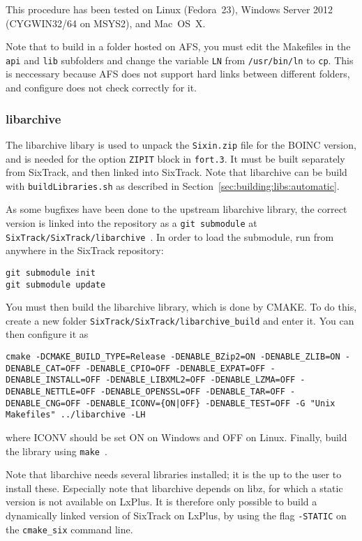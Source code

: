 \documentclass[english,BCOR=0mm,DIV=18]{scrartcl}
\begin{document}
This procedure has been tested on Linux (Fedora~23), Windows Server 2012 (CYGWIN32/64 on MSYS2), and Mac~OS~X.

Note that to build in a folder hosted on AFS, you must edit the Makefiles in the \texttt{api} and \texttt{lib} subfolders and change the variable \texttt{LN} from \texttt{/usr/bin/ln} to \texttt{cp}.
This is neccessary because AFS does not support hard links between different folders, and configure does not check correctly for it.

\subsubsection{libarchive}
\label{sec:building:libs:libarchive}
The libarchive libary is used to unpack the \texttt{Sixin.zip} file for the BOINC version, and is needed for the option \texttt{ZIPIT} block in \texttt{fort.3}.
It must be built separately from SixTrack, and then linked into SixTrack.
Note that libarchive can be build with \texttt{buildLibraries.sh} as described in Section~\ref{sec:building:libs:automatic}.

As some bugfixes have been done to the upstream libarchive library, the correct version is linked into the repository as a \texttt{git submodule}  at \texttt{SixTrack/SixTrack/libarchive}~.
In order to load the submodule, run from anywhere in the SixTrack repository:
\begin{lstlisting}
git submodule init
git submodule update
\end{lstlisting}

You must then build the libarchive library, which is done by CMAKE.
To do this, create a new folder \texttt{SixTrack/SixTrack/libarchive\_build} and enter it.
You can then configure it as 
\begin{lstlisting}
cmake -DCMAKE_BUILD_TYPE=Release -DENABLE_BZip2=ON -DENABLE_ZLIB=ON -DENABLE_CAT=OFF -DENABLE_CPIO=OFF -DENABLE_EXPAT=OFF -DENABLE_INSTALL=OFF -DENABLE_LIBXML2=OFF -DENABLE_LZMA=OFF -DENABLE_NETTLE=OFF -DENABLE_OPENSSL=OFF -DENABLE_TAR=OFF -DENABLE_CNG=OFF -DENABLE_ICONV={ON|OFF} -DENABLE_TEST=OFF -G "Unix Makefiles" ../libarchive -LH
\end{lstlisting}
where ICONV should be set ON on Windows and OFF on Linux.
Finally, build the library using \texttt{make}~.

Note that libarchive needs several libraries installed; it is the up to the user to install these.
Especially note that libarchive depends on libz, for which a static version is not available on LxPlus.
It is therefore only possible to build a dynamically linked version of SixTrack on LxPlus, by using the flag \texttt{-STATIC} on the \texttt{cmake\_six} command line.
\end{document}
